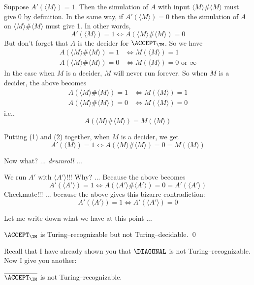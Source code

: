 Suppose $A'(\langle M \rangle) = 1$.
Then the simulation of $A$ with input 
$\langle M \rangle \# \langle M \rangle$ must give 0 by definition.
In the same way, if
$A'(\langle M \rangle) = 0$
then the simulation of $A$ on 
$\langle M \rangle \# \langle M \rangle$ must give 1.
In other words,
\[
A'(\langle M \rangle) = 1
\iff
A(\langle M \rangle \# \langle M \rangle) = 0
\tag{1}
\]
But don't forget that $A$ is the decider for $\ACCEPT_\TM$.
So we have
\begin{align*}
A(\langle M \rangle \# \langle M \rangle) = 1
&\iff M(\langle M \rangle) = 1 \\
A(\langle M \rangle \# \langle M \rangle) = 0
&\iff M(\langle M \rangle) = 0 \text{ or } \infty
\end{align*}
In the case when $M$ is a decider, $M$ will never run forever.
So when $M$ is a decider, the above becomes
\begin{align*}
A(\langle M \rangle \# \langle M \rangle) = 1
&\iff M(\langle M \rangle) = 1 \\
A(\langle M \rangle \# \langle M \rangle) = 0
&\iff M(\langle M \rangle) = 0
\end{align*}
i.e.,
\[
A(\langle M \rangle \# \langle M \rangle)
= M(\langle M \rangle)
\tag{2}
\]

Putting (1) and (2) together, when $M$ is a decider,
we get
\[
A'(\langle M \rangle) = 1
\iff
A(\langle M \rangle \# \langle M \rangle) = 0 = M(\langle M \rangle)
\]

Now what? ... \textit{drumroll} ... 

We run $A'$ with $\langle A' \rangle$!!!
Why? ... Because the above becomes
\[
A'(\langle A' \rangle) = 1
\iff
A(\langle A' \rangle \# \langle A' \rangle) = 0
= A'(\langle A' \rangle)
\]
Checkmate!!! ... because the above
gives this bizarre contradiction:
\[
A'(\langle A' \rangle) = 1
\iff
A'(\langle A' \rangle) = 0
\]


Let me write down what we have at this point ...

\begin{thm}
$\ACCEPT_\TM$ is Turing--recognizable but 
 not Turing--decidable.
\qed
\end{thm}

Recall that I have already shown you that
$\DIAGONAL$ is not Turing--recognizable.
Now I give you another:

\begin{thm}
$\overline{\ACCEPT_\TM}$ is not Turing--recognizable.
\end{thm}

